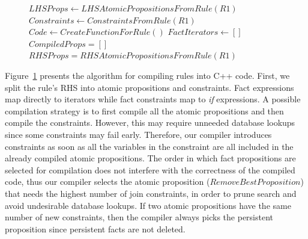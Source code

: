\begin{figure}
\begin{algorithm}[H]
 $LHSProps \longleftarrow LHSAtomicPropositionsFromRule(R1)$\;
 $Constraints \longleftarrow ConstraintsFromRule(R1)$\;
 $Code \longleftarrow CreateFunctionForRule()$\;
 $FactIterators \longleftarrow []$\;
 $CompiledProps = []$\;
 $RHSProps = RHSAtomicPropositionsFromRule(R1)$\;
\end{algorithm}
 \label{alg:compile_rule}
\end{figure}

Figure~\ref{alg:compile_rule} presents the algorithm for compiling rules into
C++ code. First, we split the rule's RHS into atomic propositions and
constraints. Fact expressions map directly to iterators while fact constraints
map to \emph{if} expressions. A possible compilation strategy is to first
compile all the atomic propositions and then compile the constraints. However,
this may require unneeded database lookups since some constraints may fail
early.  Therefore, our compiler introduces constraints as soon as all the
variables in the constraint are all included in the already compiled atomic
propositions. The order in which fact propositions are selected for compilation
does not interfere with the correctness of the compiled code, thus our compiler
selects the atomic proposition ($RemoveBestProposition$) that needs the highest
number of join constraints, in order to prune search and avoid undesirable
database lookups. If two atomic propositions have the same number of new
constraints, then the compiler always picks the persistent proposition since
persistent facts are not deleted.

